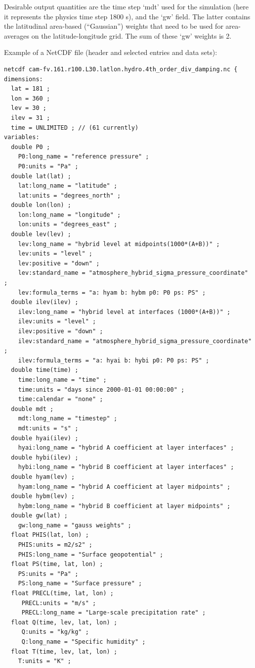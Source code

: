 \documentclass[times,doublespace]{fldauth}
\begin{document}
{\begin{appendix}
Desirable output quantities are the time step `mdt' used for the simulation (here it represents the physics time step 1800 s), and the `gw' field. The latter contains the latitudinal area-based (``Gaussian'') weights that need to be used for area-averages on the latitude-longitude grid. The sum of these `gw' weights is 2.

 \vspace{0.5cm}
\noindent
Example of a NetCDF file (header and selected entries and data sets):
\begin{verbatim}
netcdf cam-fv.161.r100.L30.latlon.hydro.4th_order_div_damping.nc {
dimensions:
  lat = 181 ;
  lon = 360 ;
  lev = 30 ;
  ilev = 31 ;
  time = UNLIMITED ; // (61 currently)
variables:
  double P0 ;
    P0:long_name = "reference pressure" ;
    P0:units = "Pa" ;
  double lat(lat) ;
    lat:long_name = "latitude" ;
    lat:units = "degrees_north" ;
  double lon(lon) ;
    lon:long_name = "longitude" ;
    lon:units = "degrees_east" ;
  double lev(lev) ;
    lev:long_name = "hybrid level at midpoints(1000*(A+B))" ;
    lev:units = "level" ;
    lev:positive = "down" ;
    lev:standard_name = "atmosphere_hybrid_sigma_pressure_coordinate" ;
    lev:formula_terms = "a: hyam b: hybm p0: P0 ps: PS" ;
  double ilev(ilev) ;
    ilev:long_name = "hybrid level at interfaces (1000*(A+B))" ;
    ilev:units = "level" ;
    ilev:positive = "down" ;
    ilev:standard_name = "atmosphere_hybrid_sigma_pressure_coordinate" ;
    ilev:formula_terms = "a: hyai b: hybi p0: P0 ps: PS" ;
  double time(time) ;
    time:long_name = "time" ;
    time:units = "days since 2000-01-01 00:00:00" ;
    time:calendar = "none" ;
  double mdt ;
    mdt:long_name = "timestep" ;
    mdt:units = "s" ;
  double hyai(ilev) ;
    hyai:long_name = "hybrid A coefficient at layer interfaces" ;
  double hybi(ilev) ;
    hybi:long_name = "hybrid B coefficient at layer interfaces" ;
  double hyam(lev) ;
    hyam:long_name = "hybrid A coefficient at layer midpoints" ;
  double hybm(lev) ;
    hybm:long_name = "hybrid B coefficient at layer midpoints" ;
  double gw(lat) ;
    gw:long_name = "gauss weights" ;
  float PHIS(lat, lon) ;
    PHIS:units = m2/s2" ;
    PHIS:long_name = "Surface geopotential" ;
  float PS(time, lat, lon) ;
    PS:units = "Pa" ;
    PS:long_name = "Surface pressure" ;
  float PRECL(time, lat, lon) ;
     PRECL:units = "m/s" ;
     PRECL:long_name = "Large-scale precipitation rate" ;
  float Q(time, lev, lat, lon) ;
     Q:units = "kg/kg" ;
     Q:long_name = "Specific humidity" ;      
  float T(time, lev, lat, lon) ;
    T:units = "K" ;

\end{verbatim}
\end{appendix}}
\end{document}
